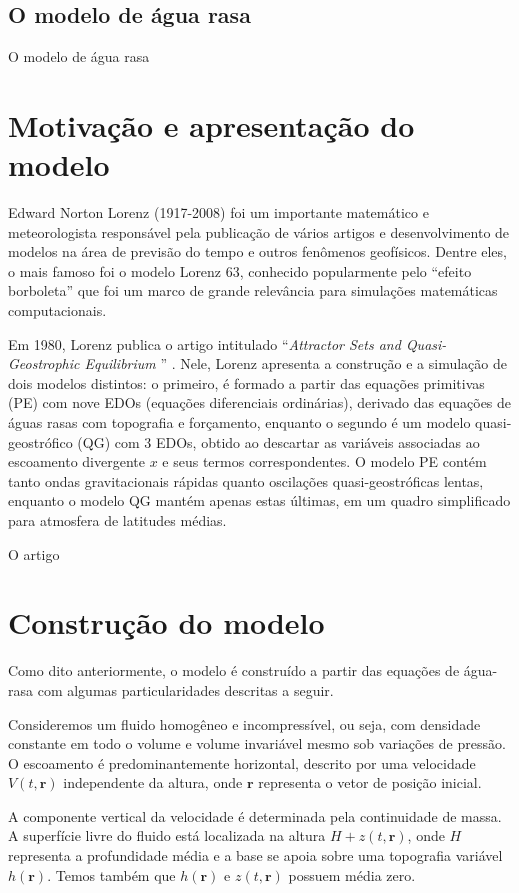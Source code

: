 \subsection{O modelo de água rasa} \label{subsec:ch01_agua_rasa}
O modelo de água rasa 
\section{Motivação e apresentação do modelo} \label{sec:ch01_apresentacao_do_modelo}

Edward Norton Lorenz (1917-2008) foi um importante matemático e meteorologista responsável pela publicação de vários artigos e desenvolvimento de modelos na área de previsão do tempo e outros fenômenos geofísicos. Dentre eles, o mais famoso foi o modelo Lorenz 63, conhecido popularmente pelo ``efeito borboleta'' que foi um marco de grande relevância para simulações matemáticas computacionais.

Em 1980, Lorenz publica o artigo intitulado ``\textit{Attractor Sets and Quasi-Geostrophic Equilibrium }'' \citep{Lorenz1980}. Nele, Lorenz apresenta a construção e a simulação de dois modelos distintos: o primeiro, é formado a partir das equações primitivas (PE) com nove EDOs (equações diferenciais ordinárias), derivado das equações de águas rasas com topografia e forçamento, enquanto o segundo é um modelo quasi-geostrófico (QG) com 3 EDOs, obtido ao descartar as variáveis associadas ao escoamento divergente $x$ e seus termos correspondentes. O modelo PE contém tanto ondas gravitacionais rápidas quanto oscilações quasi-geostróficas lentas, enquanto o modelo QG mantém apenas estas últimas, em um quadro simplificado para atmosfera de latitudes médias.

O artigo 

\section{Construção do modelo} \label{sec:ch01_construcao_do_modelo}
Como dito anteriormente, o modelo é construído a partir das equações de água-rasa com algumas particularidades descritas a seguir.

Consideremos um fluido homogêneo e incompressível, ou seja, com densidade constante em todo o volume e volume invariável mesmo sob variações de pressão. O escoamento é predominantemente horizontal, descrito por uma velocidade $V(t, \mathbf{r})$ independente da altura, onde $\mathbf{r}$ representa o vetor de posição inicial.

A componente vertical da velocidade é determinada pela continuidade de massa. A superfície livre do fluido está localizada na altura $H + z(t, \mathbf{r})$, onde $H$ representa a profundidade média e a base se apoia sobre uma topografia variável $h(\mathbf{r})$. Temos também que $h(\mathbf{r})$ e $z(t, \mathbf{r})$ possuem média zero.

